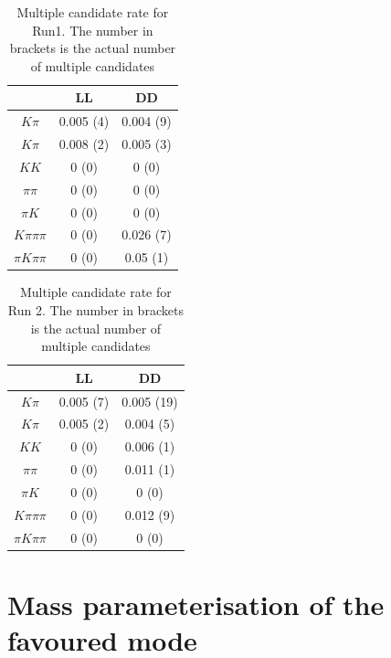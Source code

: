 \begin{table}[h]
\centering
\begin{tabular}{ccc}
\hline
& LL & DD \\
\hline
$K\pi$ & 0.005 (4) & 0.004 (9) \\
$K\pi$ & 0.008 (2) & 0.005 (3) \\
$KK$ & 0 (0) & 0 (0) \\
$\pi\pi$ & 0 (0) & 0 (0) \\
$\pi K$ & 0 (0) & 0 (0) \\
$K\pi\pi\pi$ & 0 (0) & 0.026 (7) \\
$\pi K\pi\pi$ & 0 (0) & 0.05 (1) \\
\hline
\end{tabular}
\caption{Multiple candidate rate for Run1. The number in brackets is the actual number of multiple candidates}
\label{multiplecandidatesRun1}
\end{table}

\begin{table}[h]
\centering
\begin{tabular}{ccc}
\hline
& LL & DD \\
\hline
$K\pi$ & 0.005 (7) & 0.005 (19) \\
$K\pi$ & 0.005 (2) & 0.004 (5) \\
$KK$ & 0 (0) & 0.006 (1) \\
$\pi\pi$ & 0 (0) & 0.011 (1) \\
$\pi K$ & 0 (0) & 0 (0) \\
$K\pi\pi\pi$ & 0 (0) & 0.012 (9) \\
$\pi K\pi\pi$ & 0 (0) & 0 (0) \\
\hline
\end{tabular}
\caption{Multiple candidate rate for Run 2. The number in brackets is the actual number of multiple candidates}
\label{multiplecandidatesRun2}
\end{table}

\clearpage

\section{Mass parameterisation of the favoured mode}
\label{sec:massfit}

